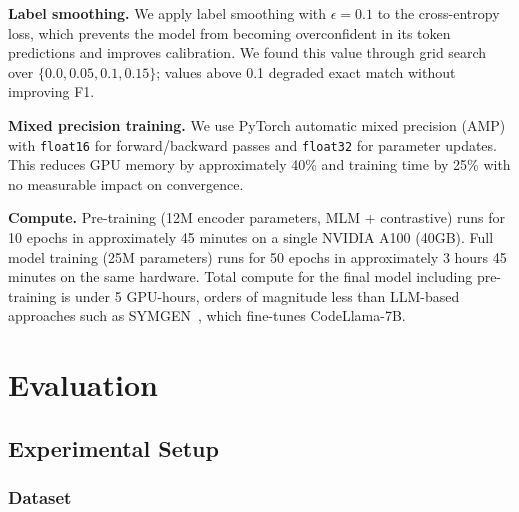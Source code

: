 \documentclass[sigconf,nonacm]{acmart}
\begin{document}
\textbf{Label smoothing.} We apply label smoothing with $\epsilon = 0.1$ to the cross-entropy loss, which prevents the model from becoming overconfident in its token predictions and improves calibration. We found this value through grid search over $\{0.0, 0.05, 0.1, 0.15\}$; values above 0.1 degraded exact match without improving F1.

\textbf{Mixed precision training.} We use PyTorch automatic mixed precision (AMP) with \texttt{float16} for forward/backward passes and \texttt{float32} for parameter updates. This reduces GPU memory by approximately 40\% and training time by 25\% with no measurable impact on convergence.

\textbf{Compute.} Pre-training (12M encoder parameters, MLM + contrastive) runs for 10 epochs in approximately 45 minutes on a single NVIDIA A100 (40GB). Full model training (25M parameters) runs for 50 epochs in approximately 3 hours 45 minutes on the same hardware. Total compute for the final model including pre-training is under 5 GPU-hours, orders of magnitude less than LLM-based approaches such as SYMGEN~\cite{symgen}, which fine-tunes CodeLlama-7B.

\section{Evaluation}
\label{sec:eval}

\subsection{Experimental Setup}

\subsubsection{Dataset}

\begin{table}[t]
    \centering
    \caption{Dataset statistics.}
    \label{tab:dataset}
\end{table}
\end{document}

